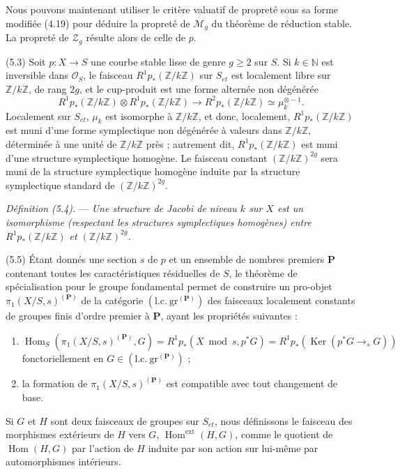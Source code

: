 \documentclass[10pt]{article}
\newcommand{\Hom}{\operatorname{Hom}}
\newcommand{\cO}{\mathcal O}
\begin{document}
Nous pouvons maintenant utiliser le critère valuatif de propreté sous sa forme modifiée (4.19) pour déduire la propreté de $\mathcal M_g$ du théorème de réduction stable. La propreté de $\mathcal Z_g$ résulte alors de celle de $p$.

\medskip
\noindent(5.3) Soit $p:X\to S$ une courbe stable lisse de genre $g\geq2$ sur $S$. Si $k\in\mathbb N$ est inversible dans $\cO_S$, le faisceau $R^1p_*(\mathbb Z/k\mathbb Z)$ sur $S_{et}$ est localement libre sur $\mathbb Z/k\mathbb Z$, de rang $2g$, et le cup-produit est une forme alternée non dégénérée
\[
R^1p_*(\mathbb Z/k\mathbb Z)\otimes R^1p_*(\mathbb Z/k\mathbb Z)
\longrightarrow R^2p_*(\mathbb Z/k\mathbb Z)\simeq\mu_k^{\otimes -1}.
\]
Localement sur $S_{et}$, $\mu_k$ est isomorphe à $\mathbb Z/k\mathbb Z$, et donc, localement, $R^1p_*(\mathbb Z/k\mathbb Z)$ est muni d'une forme symplectique non dégénérée à valeurs dans $\mathbb Z/k\mathbb Z$, déterminée à une unité de $\mathbb Z/k\mathbb Z$ près ; autrement dit, $R^1p_*(\mathbb Z/k\mathbb Z)$ est muni d'une structure symplectique homogène. Le faisceau constant $(\mathbb Z/k\mathbb Z)^{2g}$ sera muni de la structure symplectique homogène induite par la structure symplectique standard de $(\mathbb Z/k\mathbb Z)^{2g}$.

\medskip
\noindent\emph{Définition (5.4).} --- \emph{Une structure de Jacobi de niveau $k$ sur $X$ est un isomorphisme (respectant les structures symplectiques homogènes) entre $R^1p_*(\mathbb Z/k\mathbb Z)$ et $(\mathbb Z/k\mathbb Z)^{2g}$.}

\medskip
\noindent(5.5) Étant donnés une section $s$ de $p$ et un ensemble de nombres premiers $\mathbf P$ contenant toutes les caractéristiques résiduelles de $S$, le théorème de spécialisation pour le groupe fondamental permet de construire un pro-objet $\pi_1(X/S,s)^{(\mathbf P)}$ de la catégorie $(\mathrm{l.c.}\ \mathrm{gr}^{(\mathbf P)})$ des faisceaux localement constants de groupes finis d'ordre premier à $\mathbf P$, ayant les propriétés suivantes :
\begin{enumerate}[label=(\roman*)]
\item $\Hom_S(\pi_1(X/S,s)^{(\mathbf P)},G)=R^1p_*(X\bmod s,p^*G)=R^1p_*(\operatorname{Ker}(p^*G\to_s G))$ fonctoriellement en $G\in(\mathrm{l.c.}\ \mathrm{gr}^{(\mathbf P)})$ ;
\item la formation de $\pi_1(X/S,s)^{(\mathbf P)}$ est compatible avec tout changement de base.
\end{enumerate}

Si $G$ et $H$ sont deux faisceaux de groupes sur $S_{et}$, nous définissons le faisceau des morphismes extérieurs de $H$ vers $G$, $\Hom^{\mathrm{ext}}(H,G)$, comme le quotient de $\Hom(H,G)$ par l'action de $H$ induite par son action sur lui-même par automorphismes intérieurs.
\end{document}
